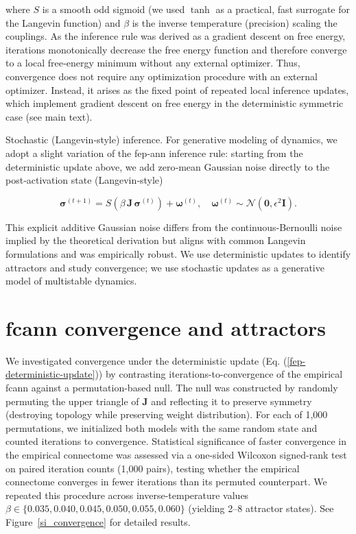 \documentclass{article}
\begin{document}
where $S$ is a smooth odd sigmoid (we used $\tanh$ as a practical, fast surrogate for the Langevin function) and $\beta$ is the inverse temperature (precision) scaling the couplings. As the inference rule was derived as a gradient descent on free energy, iterations monotonically decrease the free energy function and therefore converge to a local free‑energy minimum without any external optimizer. Thus, convergence does not require any optimization procedure with an external optimizer. Instead, it arises as the fixed point of repeated local inference updates, which implement gradient descent on free energy in the deterministic symmetric case (see main text).

Stochastic (Langevin‑style) inference. For generative modeling of dynamics, we adopt a slight variation of the \acrshort{fep}‑\acrshort{ann} inference rule: starting from the deterministic update above, we add zero‑mean Gaussian noise directly to the post‑activation state (Langevin‑style)

\begin{equation}
\label{langevin-update}
\boldsymbol{\sigma}^{(t+1)} = S\!\left( \beta\, \boldsymbol{J}\, \boldsymbol{\sigma}^{(t)} \right) + \boldsymbol{\omega}^{(t)}, \quad \boldsymbol{\omega}^{(t)} \sim \mathcal{N}(\boldsymbol{0}, \epsilon^2 \boldsymbol{I}).
\end{equation}

This explicit additive Gaussian noise differs from the continuous‑Bernoulli noise implied by the theoretical derivation but aligns with common Langevin formulations and was empirically robust. We use deterministic updates to identify attractors and study convergence; we use stochastic updates as a generative model of multistable dynamics.

\section{\acrshort{fcann} convergence and attractors}

We investigated convergence under the deterministic update (Eq. (\ref{fep-deterministic-update})) by contrasting iterations-to-convergence of the empirical \acrshort{fcann} against a permutation-based null. The null was constructed by randomly permuting the upper triangle of $\boldsymbol{J}$ and reflecting it to preserve symmetry (destroying topology while preserving weight distribution). For each of 1,000 permutations, we initialized both models with the same random state and counted iterations to convergence. Statistical significance of faster convergence in the empirical connectome was assessed via a one-sided Wilcoxon signed-rank test on paired iteration counts (1,000 pairs), testing whether the empirical connectome converges in fewer iterations than its permuted counterpart. We repeated this procedure across inverse-temperature values $\beta \in \{0.035, 0.040, 0.045, 0.050, 0.055, 0.060\}$ (yielding 2--8 attractor states). See Figure~\ref{si_convergence} for detailed results.
\end{document}
